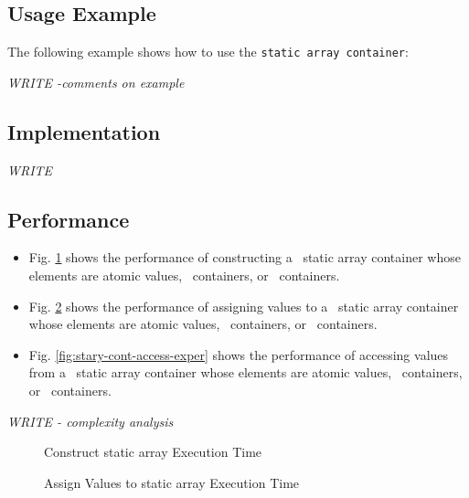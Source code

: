 \subsection{Usage Example} \label{sec-stary-cont-use}

The following example shows how to use the \texttt{static array container}:


\vspace{0.4cm} \textit{WRITE -comments on example}

\subsection{Implementation} \label{sec-stary-cont-impl}

\textit{WRITE}

\subsection{Performance} \label{sec-stary-cont-perf}

\begin{itemize}
\item
Fig. \ref{fig:stary-cont-constr-exper}
shows the performance of constructing a \stapl\ static array container
whose elements are atomic values, \stl\ containers, or \stapl\ containers.
\item
Fig. \ref{fig:stary-cont-assign-exper}
shows the performance of assigning values to a \stapl\ static array container
whose elements are atomic values, \stl\ containers, or \stapl\ containers.
\item
Fig. \ref{fig:stary-cont-access-exper}
shows the performance of accessing values from a \stapl\ static array container
whose elements are atomic values, \stl\ containers, or \stapl\ containers.
\end{itemize}

\textit{WRITE - complexity analysis}

\begin{figure}[p]
\caption{Construct static array Execution Time}
\label{fig:stary-cont-constr-exper}
\end{figure}

\begin{figure}[p]
\caption{Assign Values to static array Execution Time}
\label{fig:stary-cont-assign-exper}
\end{figure}

